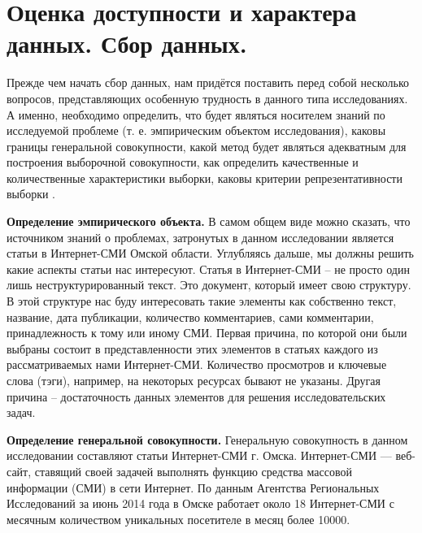 \section{Оценка доступности и характера данных. Сбор данных.} \label{sect2_2}
Прежде чем начать сбор данных, нам придётся поставить перед собой несколько вопросов, представляющих особенную трудность в данного типа исследованиях. А именно, необходимо определить, что будет являться носителем знаний по исследуемой проблеме (т. е. эмпирическим объектом исследования), каковы границы генеральной совокупности, какой метод будет являться адекватным для построения выборочной совокупности, как определить качественные и количественные характеристики выборки, каковы критерии репрезентативности выборки \cite{methodlogy_internet}.

\textbf{Определение эмпирического объекта.} В самом общем виде можно сказать, что источником знаний о проблемах, затронутых в данном исследовании является статьи в Интернет-СМИ Омской области. Углубляясь дальше, мы должны решить какие аспекты статьи нас интересуют. Статья в Интернет-СМИ -- не просто один лишь неструктурированный текст. Это документ, который имеет свою структуру. В этой структуре нас буду интересовать такие элементы как собственно текст, название, дата публикации, количество комментариев, сами комментарии, принадлежность к тому или иному СМИ. Первая причина, по которой они были выбраны состоит в представленности этих элементов в статьях каждого из рассматриваемых нами Интернет-СМИ. Количество просмотров и ключевые слова (тэги), например, на некоторых ресурсах бывают не указаны. Другая причина -- достаточность данных элементов для решения исследовательских задач.

\textbf{Определение генеральной совокупности.} Генеральную совокупность в данном исследовании составляют статьи Интернет-СМИ г. Омска. Интернет-СМИ — веб-сайт, ставящий своей задачей выполнять функцию средства массовой информации (СМИ) в сети Интернет. По данным Агентства Региональных Исследований за июнь 2014 года в Омске работает около 18 Интернет-СМИ с месячным количеством уникальных посетителе в месяц более 10000\cite{ari_rating}. 

